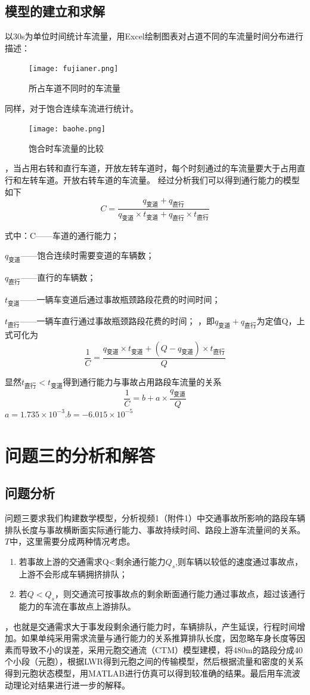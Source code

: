 \documentclass[UTF8,12.05pt]{ctexart}
\begin{document}
\subsection{模型的建立和求解}
以30s为单位时间统计车流量，用Excel绘制图表对占道不同的车流量时间分布进行描述：
\begin{figure}[H]
  \centering
  \texttt{[image: fujianer.png]}
  \caption{所占车道不同时的车流量}
\end{figure}
同样，对于饱合连续车流进行统计。
\begin{figure}[H]
  \centering
  \texttt{[image: baohe.png]}
  \caption{饱合时车流量的比较}
\end{figure}
，当占用右转和直行车道，开放左转车道时，每个时刻通过的车流量要大于占用直行和左转车道。开放右转车道的车流量。
经过分析我们可以得到通行能力的模型如下
$$C=\frac{q_{\text{变道}}+q_{\text{直行}}}{q_{\text{变道}}\times t_{\text{变道}}+q_{\text{直行}}\times t_{\text{直行}}}$$
\par 式中：C——车道的通行能力；
\par $q_{\text{变道}}$——饱合连续时需要变道的车辆数；
\par $q_{\text{直行}}$——直行的车辆数；
\par $t_{\text{变道}}$——一辆车变道后通过事故瓶颈路段花费的时间时间；
\par $t_{\text{直行}}$——一辆车直行通过事故瓶颈路段花费的时间；
，即$q_{\text{变道}}+q_{\text{直行}}$为定值Q，上式可化为
$$\frac{1}{C}=\frac{q_{\text{变道}}\times t_{\text{变道}}+(Q-q_{\text{变道}})\times t_{\text{直行}}}{Q}$$
\par 显然$t_{\text{直行}}<t_{\text{变道}}$得到通行能力与事故占用路段车流量的关系
$$\frac{1}{C}=b+a\times \frac{q_{\text{变道}}}{Q}$$
$a=1.735\times10^{-3}.b=-6.015\times10^{-5}$
\section{\heiti{}问题三的分析和解答}
\subsection{问题分析}
问题三要求我们构建数学模型，分析视频1（附件1）中交通事故所影响的路段车辆排队长度与事故横断面实际通行能力、事故持续时间、路段上游车流量间的关系。
$T$中，这里需要分成两种情况考虑\cite{accident}。
\begin{enumerate}
  \item 若事故上游的交通需求Q<剩余通行能力$Q_{s}$,则车辆以较低的速度通过事故点，上游不会形成车辆拥挤排队；
  \item 若$Q<Q_{s}$，则交通流可按事故点的剩余断面通行能力通过事故点，超过该通行能力的车流在事故点上游排队。
\end{enumerate}
，也就是交通需求大于事发段剩余通行能力时，车辆排队，产生延误，行程时间增加\cite{K}。如果单纯采用需求流量与通行能力的关系推算排队长度，因忽略车身长度等因素而导致不小的误差，采用元胞交通流（CTM）模型建模，将480m的路段分成40个小段（元胞），根据LWR得到元胞之间的传输模型，然后根据流量和密度的关系得到元胞状态模型，用\newline MATLAB进行仿真可以得到较准确的结果。最后用车流波动理论对结果进行进一步的解释。
\end{document}

